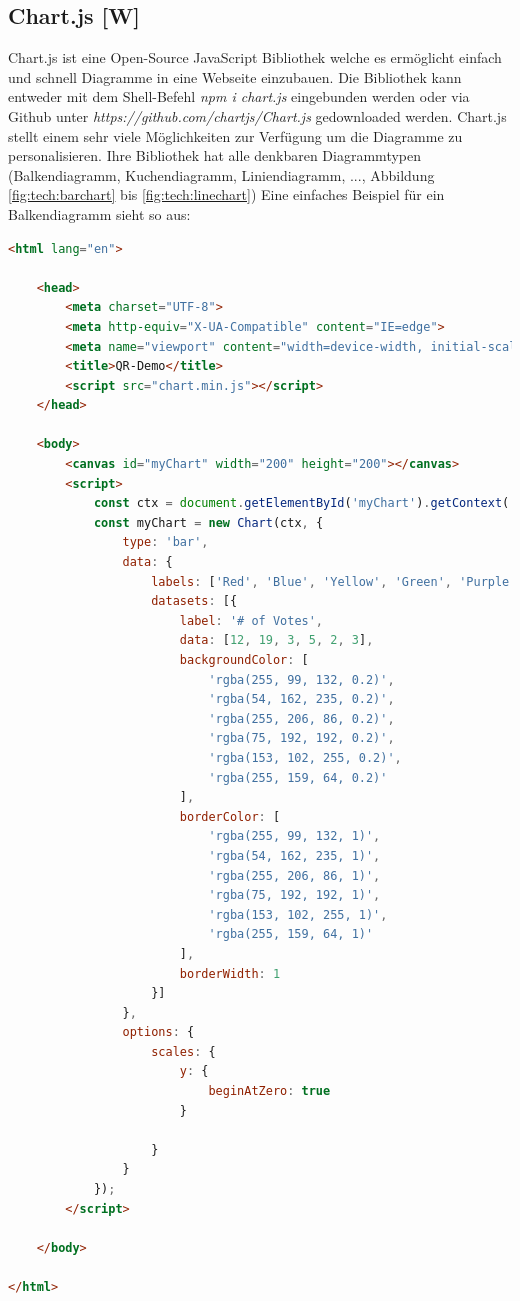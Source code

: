 \subsection{Chart.js [W]} \cite{chartJs} \label{ChartJs} 
Chart.js ist eine Open-Source JavaScript Bibliothek welche es ermöglicht einfach und schnell Diagramme
in eine Webseite einzubauen. Die Bibliothek kann entweder mit dem Shell-Befehl \textit{npm i chart.js} eingebunden werden oder via Github unter
\textit{https://github.com/chartjs/Chart.js} gedownloaded werden. Chart.js stellt einem sehr
viele Möglichkeiten zur Verfügung um die Diagramme zu personalisieren.
Ihre Bibliothek hat alle denkbaren Diagrammtypen (Balkendiagramm, Kuchendiagramm, Liniendiagramm, ..., Abbildung \ref{fig:tech:barchart} bis \ref{fig:tech:linechart})
Eine einfaches Beispiel für ein Balkendiagramm sieht so aus:
\begin{lstlisting}[language=html,caption=Balkendiagramm HTML Code,label=lst:tech:gaussianBlur]
<html lang="en">

    <head>
        <meta charset="UTF-8">
        <meta http-equiv="X-UA-Compatible" content="IE=edge">
        <meta name="viewport" content="width=device-width, initial-scale=1.0">
        <title>QR-Demo</title>
        <script src="chart.min.js"></script>
    </head>

    <body>
        <canvas id="myChart" width="200" height="200"></canvas>
        <script>
            const ctx = document.getElementById('myChart').getContext('2d');
            const myChart = new Chart(ctx, {
                type: 'bar',
                data: {
                    labels: ['Red', 'Blue', 'Yellow', 'Green', 'Purple', 'Orange'],
                    datasets: [{
                        label: '# of Votes',
                        data: [12, 19, 3, 5, 2, 3],
                        backgroundColor: [
                            'rgba(255, 99, 132, 0.2)',
                            'rgba(54, 162, 235, 0.2)',
                            'rgba(255, 206, 86, 0.2)',
                            'rgba(75, 192, 192, 0.2)',
                            'rgba(153, 102, 255, 0.2)',
                            'rgba(255, 159, 64, 0.2)'
                        ],
                        borderColor: [
                            'rgba(255, 99, 132, 1)',
                            'rgba(54, 162, 235, 1)',
                            'rgba(255, 206, 86, 1)',
                            'rgba(75, 192, 192, 1)',
                            'rgba(153, 102, 255, 1)',
                            'rgba(255, 159, 64, 1)'
                        ],
                        borderWidth: 1
                    }]
                },
                options: {
                    scales: {
                        y: {
                            beginAtZero: true
                        }
                        
                    }
                }
            });
        </script>

    </body>

</html>
\end{lstlisting}
